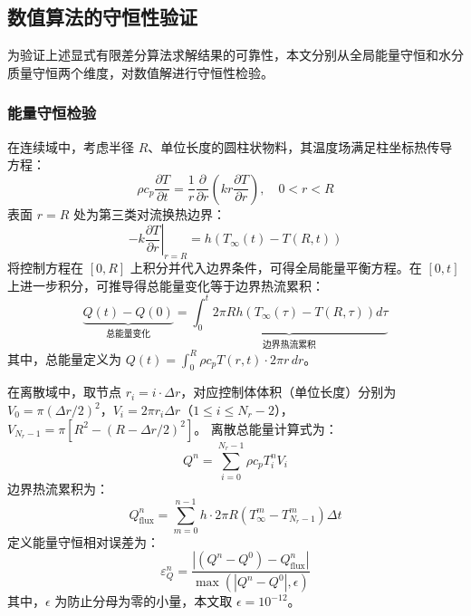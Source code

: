 \documentclass[withoutpreface,bwprint]{cumcm_thesis}
\begin{document}
\subsection{数值算法的守恒性验证}

为验证上述显式有限差分算法求解结果的可靠性，本文分别从全局能量守恒和水分质量守恒两个维度，对数值解进行守恒性检验。

\subsubsection{能量守恒检验}

在连续域中，考虑半径 \(R\)、单位长度的圆柱状物料，其温度场满足柱坐标热传导方程：
\begin{equation}
\rho c_p \frac{\partial T}{\partial t} = \frac{1}{r} \frac{\partial}{\partial r} \left( k r \frac{\partial T}{\partial r} \right), \quad 0 < r < R
\end{equation}
表面 \(r=R\) 处为第三类对流换热边界：
\begin{equation}
-k \left. \frac{\partial T}{\partial r} \right|_{r=R} = h \left( T_\infty(t) - T(R,t) \right)
\end{equation}
将控制方程在 \([0,R]\) 上积分并代入边界条件，可得全局能量平衡方程。在 \([0,t]\) 上进一步积分，可推导得总能量变化等于边界热流累积：
\begin{equation}
\underbrace{Q(t) - Q(0)}_{\text{总能量变化}} = \underbrace{\int_0^t 2\pi R h \left( T_\infty(\tau) - T(R,\tau) \right) d\tau}_{\text{边界热流累积}}
\end{equation}
其中，总能量定义为 \(Q(t) = \int_0^R \rho c_p T(r,t) \cdot 2\pi r \, dr\)。

在离散域中，取节点 \(r_i = i \cdot \Delta r\)，对应控制体体积（单位长度）分别为 \(V_0 = \pi (\Delta r/2)^2\)，\(V_i = 2\pi r_i \Delta r\)（\(1 \le i \le N_r-2\)），\(V_{N_r-1} = \pi [R^2 - (R - \Delta r/2)^2]\)。
离散总能量计算式为：
\begin{equation}
Q^n = \sum_{i=0}^{N_r-1} \rho c_p T_i^n V_i
\end{equation}
边界热流累积为：
\begin{equation}
Q_{\text{flux}}^n = \sum_{m=0}^{n-1} h \cdot 2\pi R \left( T_\infty^m - T_{N_r-1}^m \right) \Delta t
\end{equation}
定义能量守恒相对误差为：
\begin{equation}
\varepsilon_Q^n = \frac{\left| (Q^n - Q^0) - Q_{\text{flux}}^n \right|}{\max \left( |Q^n - Q^0|, \epsilon \right)}
\end{equation}
其中，\(\epsilon\) 为防止分母为零的小量，本文取 \(\epsilon = 10^{-12}\)。
\end{document}
